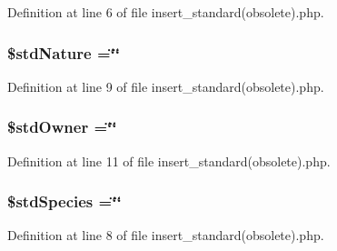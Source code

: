 Definition at line 6 of file insert\-\_\-standard(obsolete).\-php.

\hypertarget{insert__standard_07obsolete_08_8php_a53b4aa93fde2c9f30c1eecf48472c395}{
\subsubsection[{\$std\-Nature}]{\setlength{\rightskip}{0pt plus 5cm}\$std\-Nature =\char`\"{}\char`\"{}}}\label{insert__standard_07obsolete_08_8php_a53b4aa93fde2c9f30c1eecf48472c395}


Definition at line 9 of file insert\-\_\-standard(obsolete).\-php.

\hypertarget{insert__standard_07obsolete_08_8php_ab6c56dc36eabf5961ac9ee1de239c3a4}{
\subsubsection[{\$std\-Owner}]{\setlength{\rightskip}{0pt plus 5cm}\$std\-Owner =\char`\"{}\char`\"{}}}\label{insert__standard_07obsolete_08_8php_ab6c56dc36eabf5961ac9ee1de239c3a4}


Definition at line 11 of file insert\-\_\-standard(obsolete).\-php.

\hypertarget{insert__standard_07obsolete_08_8php_a1d77174f9d4320006ec140e643f95324}{
\subsubsection[{\$std\-Species}]{\setlength{\rightskip}{0pt plus 5cm}\$std\-Species =\char`\"{}\char`\"{}}}\label{insert__standard_07obsolete_08_8php_a1d77174f9d4320006ec140e643f95324}


Definition at line 8 of file insert\-\_\-standard(obsolete).\-php.

